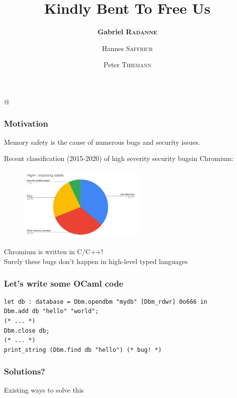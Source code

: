 \documentclass[aspectratio=169,dvipsnames,svgnames,10pt]{beamer}
\title{Kindly Bent To Free Us}
\author{\textbf{Gabriel \textsc{Radanne}}
  \and Hannes \textsc{Saffrich}
  \and Peter \textsc{Thiemann}}
\begin{document}
\lstMakeShortInline[keepspaces,basicstyle=\small\ttfamily]@

\frame[plain]{\titlepage}


\begin{frame}
  \frametitle{Motivation}

  Memory safety is the cause of numerous bugs and security issues.
  
  Recent classification (2015-2020) of \og high severity security bugs\fg in Chromium:

  \begin{figure}[h]
    \centering
    \includegraphics[width=0.55\textwidth]
    {chromium-use-after-free}
  \end{figure}

  \pause
  Chromium is written in C/C++!\\
  Surely these bugs don't happen in high-level typed languages
  
\end{frame}

\begin{frame}[fragile]
  \frametitle{Let's write some OCaml code}

\begin{verbatim}
let db : database = Dbm.opendbm "mydb" [Dbm_rdwr] 0o666 in
Dbm.add db "hello" "world";
(* ... *)
Dbm.close db;
(* ... *)
print_string (Dbm.find db "hello") (* bug! *)
\end{verbatim}
  
\end{frame}

\begin{frame}
  \frametitle{Solutions?}

  Existing ways to solve this
  
\end{frame}
\end{document}
